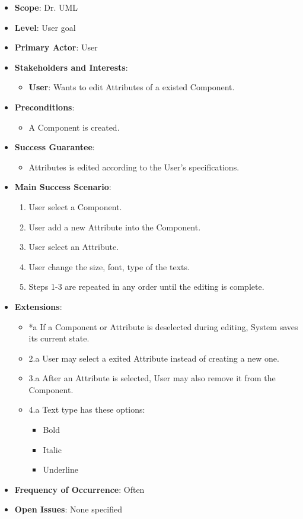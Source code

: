 \documentclass[12pt]{article}
\begin{document}
    \begin{itemize}
        \item \textbf{Scope}: Dr. UML
        \item \textbf{Level}: User goal
        \item \textbf{Primary Actor}: User
        \item \textbf{Stakeholders and Interests}:
        \begin{itemize}
            \item \textbf{User}: Wants to edit Attributes of a existed Component.
        \end{itemize}
        \item \textbf{Preconditions}:
        \begin{itemize}
            \item A Component is created.
        \end{itemize}
        \item \textbf{Success Guarantee}:
        \begin{itemize}
            \item Attributes is edited according to the User’s specifications.
        \end{itemize}
        \item \textbf{Main Success Scenario}:
        \begin{enumerate}
            \item User select a Component.
            \item User add a new Attribute into the Component.
            \item User select an Attribute.
            \item User change the size, font, type of the texts.
            \item Steps 1-3 are repeated in any order until the editing is complete.
        \end{enumerate}
        \item \textbf{Extensions}:
        \begin{itemize}
            \item *a If a Component or Attribute is deselected during editing, System saves its current state.
            \item 2.a User may select a exited Attribute instead of creating a new one.
            \item 3.a After an Attribute is selected, User may also remove it from the Component.
            \item 4.a Text type has these options:
            \begin{itemize}
                \item Bold
                \item Italic
                \item Underline
            \end{itemize}
        \end{itemize}
        \item \textbf{Frequency of Occurrence}: Often
        \item \textbf{Open Issues}: None specified
    \end{itemize}
\end{document}
